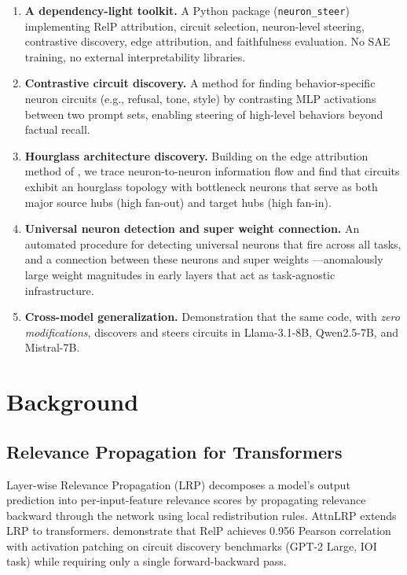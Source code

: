 \documentclass[11pt]{article}
\begin{document}
\begin{enumerate}
    \item \textbf{A dependency-light toolkit.} A Python package (\texttt{neuron\_steer}) implementing RelP attribution, circuit selection, neuron-level steering, contrastive discovery, edge attribution, and faithfulness evaluation. No SAE training, no external interpretability libraries.

    \item \textbf{Contrastive circuit discovery.} A method for finding behavior-specific neuron circuits (e.g., refusal, tone, style) by contrasting MLP activations between two prompt sets, enabling steering of high-level behaviors beyond factual recall.

    \item \textbf{Hourglass architecture discovery.} Building on the edge attribution method of \citet{arora2025circuits}, we trace neuron-to-neuron information flow and find that circuits exhibit an hourglass topology with bottleneck neurons that serve as both major source hubs (high fan-out) and target hubs (high fan-in).

    \item \textbf{Universal neuron detection and super weight connection.} An automated procedure for detecting universal neurons that fire across all tasks, and a connection between these neurons and super weights \citep{yu2024superweights}---anomalously large weight magnitudes in early layers that act as task-agnostic infrastructure.

    \item \textbf{Cross-model generalization.} Demonstration that the same code, with \emph{zero modifications}, discovers and steers circuits in Llama-3.1-8B, Qwen2.5-7B, and Mistral-7B.
\end{enumerate}


\section{Background}
\label{sec:background}

\subsection{Relevance Propagation for Transformers}

Layer-wise Relevance Propagation (LRP) \citep{bach2015pixel} decomposes a model's output prediction into per-input-feature relevance scores by propagating relevance backward through the network using local redistribution rules.
AttnLRP \citep{achtibat2024relp} extends LRP to transformers.
\citet{jafari2025relp} demonstrate that RelP achieves 0.956 Pearson correlation with activation patching on circuit discovery benchmarks (GPT-2 Large, IOI task) while requiring only a single forward-backward pass.
\end{document}
